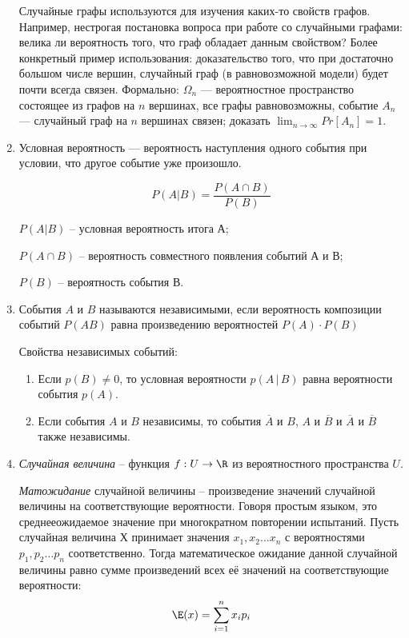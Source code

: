 \documentclass[a4paper,12pt]{article}
\begin{document}
\begin{enumerate}
    Случайные графы используются для изучения каких-то свойств графов. Например, нестрогая постановка вопроса при работе со случайными графами: велика ли вероятность того, что граф обладает данным свойством? Более конкретный пример использования: доказательство того, что при достаточно большом числе вершин, случайный граф (в равновозможной модели) будет почти всегда связен. Формально: $\Omega_n$ --- вероятностное пространство состоящее из графов на $n$ вершинах, все графы равновозможны, событие $A_n$ --- случайный граф на $n$ вершинах связен; доказать $ \lim_{n\to\infty} Pr[A_n] = 1 $.
    
	\item 
    
    Условная вероятность — вероятность наступления одного события при условии, что другое событие уже произошло.
    
   \[
       P(A|B) = \frac{{P(A\cap B)}}{P(B)}
   \]
    
    
    $P(A|B)$ – условная вероятность итога А; 
    
   $P(A\cap B)$ – вероятность совместного появления событий А и В; 
    
    $P(B)$ – вероятность события В. 
    
        \item
        События $A$ и $B$ называются независимыми, если вероятность композиции событий $P(AB)$ равна произведению вероятностей 		$P(A)\cdot P(B)$


        Свойства независимых событий: 
        \begin{enumerate}
            \item Если $p(B)\ne0$, то условная вероятности $p(A\,|\,B)$ равна вероятности события $p(A)$.
            \item Если события $A$ и $B$ независимы, то события $\overline{A}$ и $B$, $A$ и $\overline{B}$ и $\overline{A}$ и 	$\overline{B}$ также независимы.
        \end{enumerate}
	
	\item  
    
	    \textit{Случайная величина} -- функция $f : U \rightarrow \R$ из вероятностного пространства $U$.

	    \textit{Матожидание} случайной величины -- произведение значений случайной величины на соответствующие вероятности. Говоря простым языком, это среднееожидаемое значение при многократном повторении испытаний. Пусть случайная величина Х принимает значения $x_1, x_2 ... x_n$ с вероятностями $p_1, p_2 \ldots p_n$ соответственно. Тогда математическое ожидание  данной случайной величины равно сумме произведений всех её значений на соответствующие вероятности:
    	$$\E(x) = \sum_{i = 1}^n x_ip_i$$
    

\end{enumerate}
\end{document}
